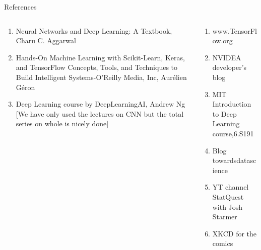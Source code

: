 \begin{frame}{References}
    \begin{columns}[T]
        \begin{column}{0.5\textwidth}
            \begin{enumerate}[$\bullet$]
                \item Neural Networks and Deep Learning: A Textbook, Charu
                C. Aggarwal
                \item Hands-On Machine Learning with Scikit-Learn, Keras,
                and TensorFlow Concepts, Tools, and Techniques to Build
                Intelligent Systems-O'Reilly Media, Inc, Aurélien Géron
                \item Deep Learning course by DeepLearningAI, Andrew Ng [We have only used the lectures on CNN but the total series on whole is nicely done]
            \end{enumerate}
        \end{column}
		\begin{column}{0.5\textwidth}
			\begin{enumerate}[$\bullet$]
				\item www.TensorFlow.org
				\item NVIDEA developer's blog
				\item MIT Introduction to Deep Learning course,6.S191
				\item Blog towardsdatascience
				\item YT channel StatQuest with Josh Starmer
				\item XKCD for the comics
			\end{enumerate}
		\end{column} 
    \end{columns}
\end{frame}
